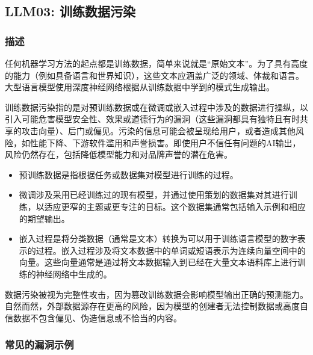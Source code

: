 \documentclass[
]{article}
\author{}
\date{}
\providecommand{\tightlist}{%
  \setlength{\itemsep}{0pt}\setlength{\parskip}{0pt}}
\begin{document}
\subsection{LLM03:
训练数据污染}\label{llm03-ux8badux7ec3ux6570ux636eux6c61ux67d3}

\subsubsection{描述}\label{ux63cfux8ff0}

任何机器学习方法的起点都是训练数据，简单来说就是``原始文本''。为了具有高度的能力（例如具备语言和世界知识），这些文本应涵盖广泛的领域、体裁和语言。大型语言模型使用深度神经网络根据从训练数据中学到的模式生成输出。

训练数据污染指的是对预训练数据或在微调或嵌入过程中涉及的数据进行操纵，以引入可能危害模型安全性、效果或道德行为的漏洞（这些漏洞都具有独特且有时共享的攻击向量）、后门或偏见。污染的信息可能会被呈现给用户，或者造成其他风险，如性能下降、下游软件滥用和声誉损害。即使用户不信任有问题的AI输出，风险仍然存在，包括降低模型能力和对品牌声誉的潜在危害。

\begin{itemize}
\tightlist
\item
  预训练数据是指根据任务或数据集对模型进行训练的过程。
\item
  微调涉及采用已经训练过的现有模型，并通过使用策划的数据集对其进行训练，以适应更窄的主题或更专注的目标。这个数据集通常包括输入示例和相应的期望输出。
\item
  嵌入过程是将分类数据（通常是文本）转换为可以用于训练语言模型的数字表示的过程。嵌入过程涉及将文本数据中的单词或短语表示为连续向量空间中的向量。这些向量通常是通过将文本数据输入到已经在大量文本语料库上进行训练的神经网络中生成的。
\end{itemize}

数据污染被视为完整性攻击，因为篡改训练数据会影响模型输出正确的预测能力。自然而然，外部数据源存在更高的风险，因为模型的创建者无法控制数据或高度自信数据不包含偏见、伪造信息或不恰当的内容。

\subsubsection{常见的漏洞示例}\label{ux5e38ux89c1ux7684ux6f0fux6d1eux793aux4f8b}
\end{document}
